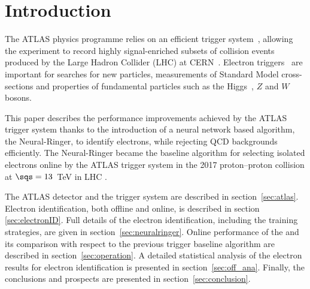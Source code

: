 \section{Introduction}


The ATLAS physics programme relies on an efficient trigger system~\cite{TRIG-2016-01}, allowing the experiment to record highly signal-enriched subsets of collision events produced by the Large Hadron Collider (LHC) at CERN~\cite{Evans_2007}. Electron triggers~\cite{TRIG-2018-05} are important for searches for new particles\cite{EXOT-2019-13, EXOT-2018-55}, measurements of Standard Model cross-sections and properties of fundamental particles such as the Higgs~\cite{HIGG-2012-27,HIGG-2016-33}, $Z$ and $W$ bosons.

This paper describes the performance improvements achieved by the ATLAS trigger system thanks to the introduction of a neural network based algorithm, the Neural-Ringer, to identify electrons, while rejecting QCD backgrounds efficiently. The Neural-Ringer became the baseline algorithm for selecting isolated electrons online by the ATLAS trigger system in the 2017 proton--proton collision at $\sqs = 13$~TeV in LHC \RunTwo.  


The ATLAS detector and the trigger system are described in section~\ref{sec:atlas}. Electron identification, both offline and online, is described in section \ref{sec:electronID}. 
Full details of the \rnn electron identification, including the training strategies, are given in section~\ref{sec:neuralringer}. Online performance of the \rnn and its comparison with respect to the previous trigger baseline algorithm are described in section~\ref{sec:operation}. A detailed statistical analysis of the \rnn electron results for electron identification is presented in section~\ref{sec:off_ana}. Finally, the conclusions and prospects are presented in section~\ref{sec:conclusion}.
% 
% 





